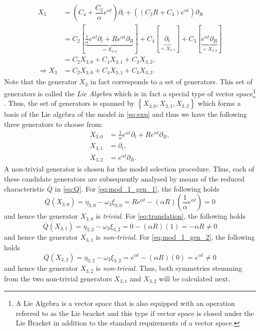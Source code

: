 \begin{align*}
  X_3&=\left(C_4+\dfrac{C_2}{\alpha}e^{\alpha t}\right)\partial_t+\left(\left(C_2R+C_3\right)e^{\alpha t}\right)\partial_R\\
   &=C_2\left[\underset{=X_{3,0}}{\underbrace{\frac{1}{\alpha}e^{\alpha t}\partial_t+Re^{\alpha t}\partial_R}}\right]+C_4\left[\underset{=X_{3,1}}{\underbrace{\partial_t}}\right]+C_3\left[\underset{=X_{3,2}}{\underbrace{e^{\alpha t}\partial_R}}\right]\\
     &=C_2X_{3,0}+C_4X_{3,1}+C_3X_{3,2},\\
  \Longrightarrow X_3&=C_2X_{3,0}+C_4X_{3,1}+C_3X_{3,2}.
\end{align*}
Note that the generator $X_3$ in fact corresponds to a set of generators. This set of generators is called the \textit{Lie Algebra} which is in fact a special type of vector space\footnote{A Lie Algebra is a vector space that is also equipped with an operation referred to as the Lie bracket and this type if vector space is closed under the Lie Bracket in addition to the standard requirements of a vector space.} \cite{hydon2000symmetry}. Thus, the set of generators is spanned by $\left\{X_{3,0},X_{3,1},X_{3,2}\right\}$ which forms a basis of the Lie algebra of the model in \eqref{eq:exp} and thus we have the following three generators to choose from:
\begin{align}
  X_{3,0}&=\frac{1}{\alpha}e^{\alpha t}\partial_t+Re^{\alpha t}\partial_R,\label{eq:mod_1_gen_1}\\
  X_{3,1}&=\partial_t,\label{eq:translation}\\
  X_{3,2}&=e^{\alpha t}\partial_R.\label{eq:mod_1_gen_2}
\end{align}
A non-trivial generator is chosen for the model selection procedure. Thus, each of these candidate generators are subsequently analysed by means of the reduced characteristic $\overline{Q}$ in \eqref{eq:Q}. For \eqref{eq:mod_1_gen_1}, the following holds
$$\overline{Q}(X_{3,0})=\eta_{3,0}-\omega_{3}\xi_{3,0}=Re^{\alpha t}-\left(\alpha R\right)\left(\frac{1}{\alpha}e^{\alpha t}\right)=0$$
and hence the generator $X_{3,0}$ is \textit{trivial}. For \eqref{eq:translation}, the following holds
$$\overline{Q}(X_{3,1})=\eta_{3,2}-\omega_{3}\xi_{3,2}=0-\left(\alpha R\right)\left(1\right)=-\alpha R\neq 0$$
and hence the generator $X_{3,1}$ is \textit{non-trivial}.  For \eqref{eq:mod_1_gen_2}, the following holds
$$\overline{Q}(X_{3,2})=\eta_{3,2}-\omega_{3}\xi_{3,2}=e^{\alpha t}-\left(\alpha R\right)\left(0\right)=e^{\alpha t}\neq 0$$
and hence the generator $X_{3,2}$ is \textit{non-trivial}. Thus, both symmetries stemming from the two non-trivial generators $X_{3,1}$ and $X_{3,2}$ will be calculated next. 


